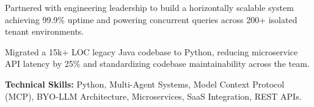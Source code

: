 \begin{cventries}
{\begin{cvitems}
        \item {Partnered with engineering leadership to build a horizontally scalable system achieving 99.9\% uptime and powering concurrent queries across 200+ isolated tenant environments.}
        \item {Migrated a 15k+ LOC legacy Java codebase to Python, reducing microservice API latency by 25\% and standardizing codebase maintainability across the team.}
        \item {\textbf{Technical Skills:} Python, Multi-Agent Systems, Model Context Protocol (MCP), BYO-LLM Architecture, Microservices, SaaS Integration, REST APIs.}
      \end{cvitems}
    }

\end{cventries}
